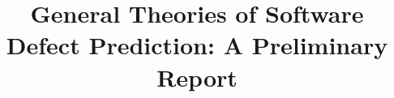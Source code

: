 \documentclass{sig-alternate}
\begin{document}
%

\title{General Theories of Software Defect Prediction: A Preliminary Report}
%
%
%
%
%
\end{document}
